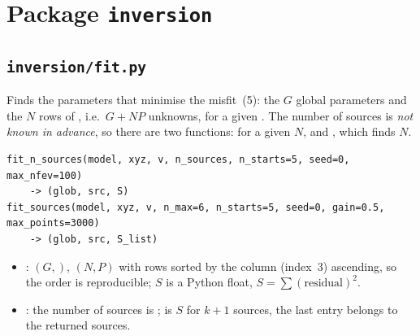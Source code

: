 \documentclass{article}
\begin{document}
\section{Package \texttt{inversion}}

\subsection{\texttt{inversion/fit.py}}

Finds the parameters that minimise the misfit~(5): the $G$ global parameters and
the $N$ rows of , i.e.\ $G+NP$ unknowns, for a given . The
number of sources is \emph{not known in advance}, so there are two functions:
 for a given $N$, and , which finds $N$.

\begin{lstlisting}
fit_n_sources(model, xyz, v, n_sources, n_starts=5, seed=0, max_nfev=100)
    -> (glob, src, S)
fit_sources(model, xyz, v, n_max=6, n_starts=5, seed=0, gain=0.5, max_points=3000)
    -> (glob, src, S_list)
\end{lstlisting}
\begin{itemize}
\item {}:  $(G,)$,  $(N,P)$ with rows
      sorted by the column  (index~3) ascending, so the order is
      reproducible; $S$ is a Python float, $S=\sum(\text{residual})^2$.
\item {}: the number of sources is ;
       is $S$ for $k+1$ sources, the last entry belongs to the
      returned sources.
\end{itemize}
\end{document}
